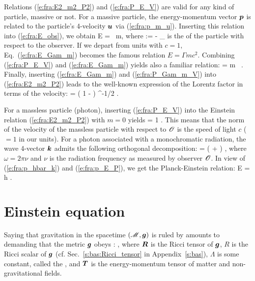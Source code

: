 Relations (\ref{e:fra:E2_m2_P2}) and (\ref{e:fra:P_E_V}) are valid for any kind of particle, massive or not.
For a massive particle, the energy-momentum vector $\bm{p}$ is related to the
particle's 4-velocity $\bm{u}$ via (\ref{e:fra:p_m_u}). Inserting this relation
into (\ref{e:fra:E_obs}), we obtain
\be \label{e:fra:E_Gam_m}
    E = \Gamma \, m,
\ee
where
\be
    \Gamma := - _{\Obs}\cdot{}
\ee
is the  of the particle with respect
to the observer. If we depart from units with $c=1$, Eq.~(\ref{e:fra:E_Gam_m})
becomes the famous relation $E = \Gamma m c^2$.
Combining (\ref{e:fra:P_E_V}) and (\ref{e:fra:E_Gam_m}) yields also a familiar
relation:
\be \label{e:fra:P_Gam_m_V}
     = \Gamma m \,  .
\ee
Finally, inserting (\ref{e:fra:E_Gam_m}) and (\ref{e:fra:P_Gam_m_V}) into
(\ref{e:fra:E2_m2_P2}) leads to the well-known expression of the Lorentz factor in
terms of the velocity:
\be
    \Gamma = \left( 1 - \cdot{} \right) ^{-1/2} .
\ee

For a massless particle (photon), inserting (\ref{e:fra:P_E_V}) into the
Einstein relation (\ref{e:fra:E2_m2_P2}) with $m=0$ yields
\be
    \cdot{} = 1 .
\ee
This means that the norm of the velocity of the massless particle with respect to $\mathscr{O}$
is the speed of light $c$ ($=1$ in our units).
For a photon associated with a monochromatic radiation, the wave 4-vector $\bm{k}$
admits the following orthogonal decomposition:
\be
     = \omega \left( +  \right) ,
\ee
where $\omega = 2\pi \nu$ and $\nu$ is the radiation frequency as measured by
observer $\mathscr{O}$. In view of (\ref{e:fra:p_hbar_k}) and (\ref{e:fra:p_E_P}), we
get the Planck-Einstein relation:
\be
    E = h \nu .
\ee

\section{Einstein equation} \label{s:fra:Einstein_eq}

Saying that gravitation in the spacetime $(\mathscr{M}, \bm{g})$ is ruled by
 amounts
to demanding that the metric $\bm{g}$ obeys :
\be \label{e:fra:Einstein_eq}
    ,
\ee
where $\bm{R}$ is the Ricci tensor of $\bm{g}$, $R$ is the Ricci scalar of $\bm{g}$
(cf. Sec.~\ref{s:bas:Ricci_tensor} in Appendix~\ref{s:bas}), $\Lambda$ is some
constant, called the ,
and $\bm{T}$ is the energy-momentum tensor of
matter and non-gravitational fields.

